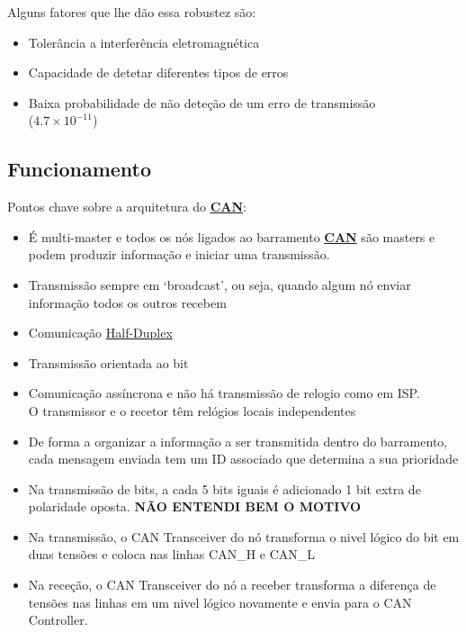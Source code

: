 \documentclass[a4paper, 12pt, onecolumn, oneside]{scrartcl}
\begin{document}
Alguns fatores que lhe dão essa robustez são:
\begin{itemize}
    \item Tolerância a interferência eletromagnética
    \item Capacidade de detetar diferentes tipos de erros
    \item Baixa probabilidade de não deteção de um erro de transmissão \\ ($4.7\times10^{-11}$)
\end{itemize}

\subsection{Funcionamento}
Pontos chave sobre a arquitetura do \hyperref[can]{\textbf{CAN}}:
\begin{itemize}
    \item É multi-master e todos os nós ligados ao barramento \hyperref[can]{\textbf{CAN}} são masters e podem produzir informação e iniciar uma transmissão.
    \item Transmissão sempre em `broadcast', ou seja, quando algum nó enviar informação todos os outros recebem
    \item Comunicação \hyperref[halfduplex]{Half-Duplex}
    \item Transmissão orientada ao bit
    \item Comunicação assíncrona e não há transmissão de relogio como em ISP.\\O transmissor e o recetor têm relógios
    locais independentes
    \item De forma a organizar a informação a ser transmitida dentro do barramento, cada mensagem enviada tem um ID associado que
    determina a sua prioridade
    \item Na transmissão de bits, a cada 5 bits iguais é adicionado 1 bit extra de polaridade oposta. \textbf{NÃO ENTENDI BEM O MOTIVO}
    \item Na transmissão, o CAN Transceiver do nó transforma o nivel lógico do bit em duas tensões e coloca nas linhas CAN\_H e CAN\_L
    \item Na receção, o CAN Transceiver do nó a receber transforma a diferença de tensões nas linhas em um nivel lógico novamente e 
    envia para o CAN Controller. 
\end{itemize}
\end{document}

